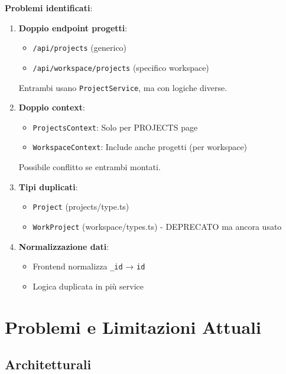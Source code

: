 \documentclass[11pt,a4paper]{article}
\begin{document}
\textbf{Problemi identificati}:
\begin{enumerate}
    \item \textbf{Doppio endpoint progetti}:
    \begin{itemize}
        \item \texttt{/api/projects} (generico)
        \item \texttt{/api/workspace/projects} (specifico workspace)
    \end{itemize}
    Entrambi usano \texttt{ProjectService}, ma con logiche diverse.
    
    \item \textbf{Doppio context}:
    \begin{itemize}
        \item \texttt{ProjectsContext}: Solo per PROJECTS page
        \item \texttt{WorkspaceContext}: Include anche progetti (per workspace)
    \end{itemize}
    Possibile conflitto se entrambi montati.
    
    \item \textbf{Tipi duplicati}:
    \begin{itemize}
        \item \texttt{Project} (projects/type.ts)
        \item \texttt{WorkProject} (workspace/types.ts) - DEPRECATO ma ancora usato
    \end{itemize}
    
    \item \textbf{Normalizzazione dati}:
    \begin{itemize}
        \item Frontend normalizza \texttt{\_id} → \texttt{id}
        \item Logica duplicata in più service
    \end{itemize}
\end{enumerate}

\newpage

\section{Problemi e Limitazioni Attuali}

\subsection{Architetturali}
\end{document}
